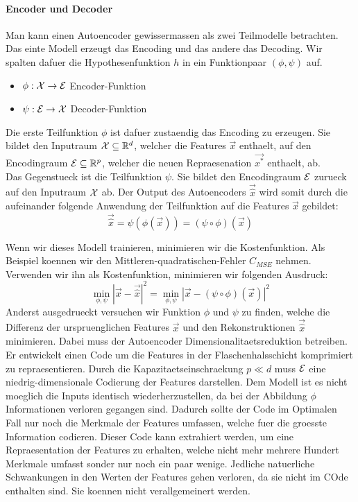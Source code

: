 \paragraph{Encoder und Decoder}
Man kann einen Autoencoder gewissermassen als zwei Teilmodelle betrachten. Das
einte Modell erzeugt das Encoding und das andere das Decoding. Wir spalten
dafuer die Hypothesenfunktion $h$ in ein Funktionpaar $(\phi,\psi)$ auf.
\begin{itemize}
  \item{$\phi: \mathcal{X} \to \mathcal{E}$ Encoder-Funktion}
  \item{$\psi: \mathcal{E} \to \mathcal{X}$ Decoder-Funktion}
\end{itemize}
Die erste Teilfunktion $\phi$ ist dafuer zustaendig das Encoding zu erzeugen. Sie
bildet den Inputraum $\mathcal{X} \subseteq \mathbb{R}^d$, welcher die Features $\vec{x}$ enthaelt, auf
den Encodingraum $\mathcal{E} \subseteq \mathbb{R}^p$, welcher die neuen
Repraesenation $\vec{x^*}$ enthaelt, ab. \\
Das Gegenstueck ist die Teilfunktion $\psi$. Sie bildet den Encodingraum
$\mathcal{E}$ zurueck auf den Inputraum $\mathcal{X}$ ab.
\para{}
Der Output des Autoencoders $\vec{\hat{x}}$ wird somit durch die aufeinander
folgende Anwendung der Teilfunktion auf die Features $\vec{x}$ gebildet:
\begin{equation}
  \vec{\hat{x}} = \psi(\phi(\vec{x})) = (\psi \circ \phi)(\vec{x})
\end{equation}

Wenn wir dieses Modell trainieren, minimieren wir die Kostenfunktion. Als
Beispiel koennen wir den Mittleren-quadratischen-Fehler $C_{MSE}$ nehmen.
Verwenden wir ihn als Kostenfunktion, minimieren wir folgenden Ausdruck:
\begin{equation}
  \min_{\phi,\psi} {|\vec{x} - \vec{\hat{x}}|}^2 = \min_{\phi,\psi} {|\vec{x} - (\psi \circ \phi)(\vec{x})|}^2
\end{equation}
Anderst ausgedrueckt versuchen wir Funktion $\phi$ und $\psi$ zu finden, welche
die Differenz der urspruenglichen Features $\vec{x}$ und den Rekonstruktionen
$\vec{\hat{x}}$ minimieren. Dabei muss der Autoencoder
Dimensionalitaetsreduktion betreiben. Er entwickelt einen Code um die Features
in der Flaschenhalsschicht komprimiert zu repraesentieren. Durch die
Kapazitaetseinschraekung $p \ll d$ muss $\mathcal{E}$ eine niedrig-dimensionale
Codierung der Features darstellen. Dem Modell ist es nicht moeglich die Inputs
identisch wiederherzustellen, da bei der Abbildung $\phi$ Informationen verloren
gegangen sind. Dadurch sollte der Code im Optimalen Fall nur noch die Merkmale
der Features umfassen, welche fuer die groesste Information codieren.
Dieser Code kann extrahiert werden, um eine Repraesentation der Features zu
erhalten, welche nicht mehr mehrere Hundert Merkmale umfasst sonder nur noch ein
paar wenige. Jedliche natuerliche Schwankungen in den Werten der Features gehen
verloren, da sie nicht im COde enthalten sind. Sie koennen nicht verallgemeinert werden.

